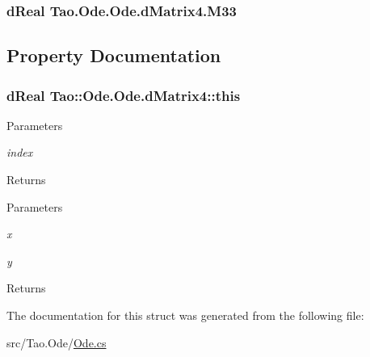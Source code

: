 \label{struct_tao_1_1_ode_1_1_ode_1_1d_matrix4_af47bfabc144919997eb911ddec7b3174}
\hypertarget{struct_tao_1_1_ode_1_1_ode_1_1d_matrix4_a37b5fe27fcebd8be5549799f46dd8ec7}{
\subsubsection[{M33}]{\setlength{\rightskip}{0pt plus 5cm}dReal {\bf Tao.Ode.Ode.dMatrix4.M33}}}
\label{struct_tao_1_1_ode_1_1_ode_1_1d_matrix4_a37b5fe27fcebd8be5549799f46dd8ec7}


\subsection{Property Documentation}
\hypertarget{struct_tao_1_1_ode_1_1_ode_1_1d_matrix4_a611b891847b708695be0f191d8b461b1}{
\subsubsection[{this}]{\setlength{\rightskip}{0pt plus 5cm}dReal Tao::Ode.Ode.dMatrix4::this}}
\label{struct_tao_1_1_ode_1_1_ode_1_1d_matrix4_a611b891847b708695be0f191d8b461b1}

\begin{DoxyParams}{Parameters}
\item[{\em index}]\end{DoxyParams}
\begin{DoxyReturn}{Returns}

\end{DoxyReturn}



\begin{DoxyParams}{Parameters}
\item[{\em x}]\item[{\em y}]\end{DoxyParams}
\begin{DoxyReturn}{Returns}

\end{DoxyReturn}


The documentation for this struct was generated from the following file:\begin{DoxyCompactItemize}
\item 
src/Tao.Ode/\hyperlink{_ode_8cs}{Ode.cs}\end{DoxyCompactItemize}
